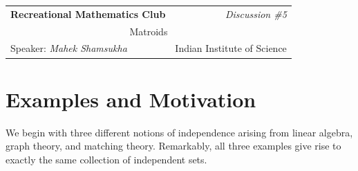 \documentclass[11pt]{article}
\theoremstyle{plain}
\theoremstyle{definition}
\begin{document}
\noindent
\begin{tabular}{|p{} r|}
\hline
\textbf{Recreational Mathematics Club} & \textit{Discussion \#5} \\[4pt]
\multicolumn{2}{|c|}{\Large Matroids} \\[4pt]
Speaker: \textit{Mahek Shamsukha} & Indian Institute of Science \\
\hline
\end{tabular}


\section{Examples and Motivation}
 
We begin with three different notions of independence arising from
linear algebra, graph theory, and matching theory.
Remarkably, all three examples give rise to exactly the same collection
of independent sets.
 
\end{document}

